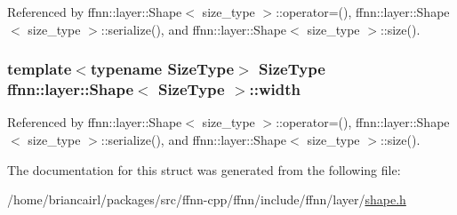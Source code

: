 Referenced by ffnn\-::layer\-::\-Shape$<$ size\-\_\-type $>$\-::operator=(), ffnn\-::layer\-::\-Shape$<$ size\-\_\-type $>$\-::serialize(), and ffnn\-::layer\-::\-Shape$<$ size\-\_\-type $>$\-::size().

\hypertarget{structffnn_1_1layer_1_1_shape_a860cbac53d9e20bdf8283298c6369cbc}{
\subsubsection[{width}]{\setlength{\rightskip}{0pt plus 5cm}template$<$typename Size\-Type$>$ Size\-Type {\bf ffnn\-::layer\-::\-Shape}$<$ Size\-Type $>$\-::width}}\label{structffnn_1_1layer_1_1_shape_a860cbac53d9e20bdf8283298c6369cbc}


Referenced by ffnn\-::layer\-::\-Shape$<$ size\-\_\-type $>$\-::operator=(), ffnn\-::layer\-::\-Shape$<$ size\-\_\-type $>$\-::serialize(), and ffnn\-::layer\-::\-Shape$<$ size\-\_\-type $>$\-::size().



The documentation for this struct was generated from the following file\-:\begin{DoxyCompactItemize}
\item 
/home/briancairl/packages/src/ffnn-\/cpp/ffnn/include/ffnn/layer/\hyperlink{shape_8h}{shape.\-h}\end{DoxyCompactItemize}
